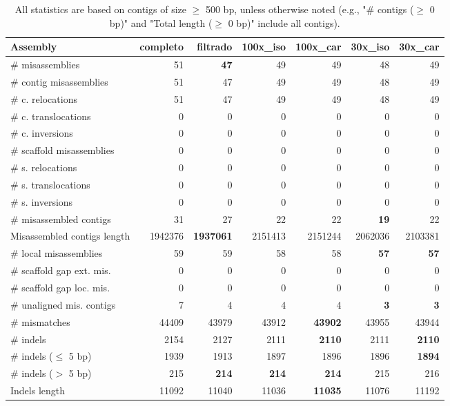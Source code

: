 \documentclass[12pt,a4paper]{article}
\begin{document}
\begin{table}[ht]
\begin{center}
\caption{All statistics are based on contigs of size $\geq$ 500 bp, unless otherwise noted (e.g., "\# contigs ($\geq$ 0 bp)" and "Total length ($\geq$ 0 bp)" include all contigs).}
\begin{tabular}{|l*{6}{|r}|}
\hline
Assembly & completo & filtrado & 100x\_iso & 100x\_car & 30x\_iso & 30x\_car \\ \hline
\# misassemblies & 51 & {\bf 47} & 49 & 49 & 48 & 49 \\ \hline
\hspace{2mm}\# contig misassemblies & 51 & 47 & 49 & 49 & 48 & 49 \\ \hline
\hspace{5mm}\# c. relocations & 51 & 47 & 49 & 49 & 48 & 49 \\ \hline
\hspace{5mm}\# c. translocations & 0 & 0 & 0 & 0 & 0 & 0 \\ \hline
\hspace{5mm}\# c. inversions & 0 & 0 & 0 & 0 & 0 & 0 \\ \hline
\hspace{2mm}\# scaffold misassemblies & 0 & 0 & 0 & 0 & 0 & 0 \\ \hline
\hspace{5mm}\# s. relocations & 0 & 0 & 0 & 0 & 0 & 0 \\ \hline
\hspace{5mm}\# s. translocations & 0 & 0 & 0 & 0 & 0 & 0 \\ \hline
\hspace{5mm}\# s. inversions & 0 & 0 & 0 & 0 & 0 & 0 \\ \hline
\# misassembled contigs & 31 & 27 & 22 & 22 & {\bf 19} & 22 \\ \hline
Misassembled contigs length & 1942376 & {\bf 1937061} & 2151413 & 2151244 & 2062036 & 2103381 \\ \hline
\# local misassemblies & 59 & 59 & 58 & 58 & {\bf 57} & {\bf 57} \\ \hline
\# scaffold gap ext. mis. & 0 & 0 & 0 & 0 & 0 & 0 \\ \hline
\# scaffold gap loc. mis. & 0 & 0 & 0 & 0 & 0 & 0 \\ \hline
\# unaligned mis. contigs & 7 & 4 & 4 & 4 & {\bf 3} & {\bf 3} \\ \hline
\# mismatches & 44409 & 43979 & 43912 & {\bf 43902} & 43955 & 43944 \\ \hline
\# indels & 2154 & 2127 & 2111 & {\bf 2110} & 2111 & {\bf 2110} \\ \hline
\hspace{5mm}\# indels ($\leq$ 5 bp) & 1939 & 1913 & 1897 & 1896 & 1896 & {\bf 1894} \\ \hline
\hspace{5mm}\# indels ($>$ 5 bp) & 215 & {\bf 214} & {\bf 214} & {\bf 214} & 215 & 216 \\ \hline
Indels length & 11092 & 11040 & 11036 & {\bf 11035} & 11076 & 11192 \\ \hline
\end{tabular}
\end{center}
\end{table}
\end{document}
